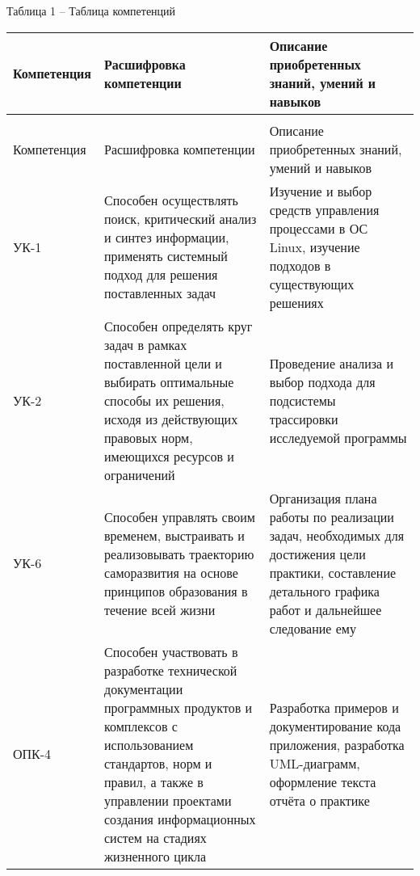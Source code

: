 \vspace{12pt}
\noindent Таблица 1 -- Таблица компетенций
\vspace{-5pt}
{
	\fontsize{13}{9}\selectfont
	\noindent \begin{longtable}[c]{|p{2.6cm}|p{6.2cm}|p{6cm}|}
		\hline
		Компетенция & Расшифровка компетенции & Описание приобретенных знаний, умений и навыков \\
		
		\endfirsthead
		\caption*{\raggedright Продолжение таблицы 1\vspace*{-35pt}}\\
		\hline
		Компетенция & Расшифровка компетенции & Описание приобретенных знаний, умений и навыков \\
		\endhead
		
		\hline
		УК-1 &
		Способен осуществлять поиск, критический анализ и синтез информации, применять системный подход для решения поставленных задач &
		Изучение и выбор средств управления процессами в ОС Linux, изучение подходов в существующих решениях
		\\ \hline
		
		УК-2 &
		Способен определять круг задач в рамках поставленной цели и выбирать оптимальные способы их решения, исходя из действующих правовых норм, имеющихся ресурсов и ограничений &
		Проведение анализа и выбор подхода для подсистемы трассировки исследуемой программы
		\\ \hline
		
		УК-6 & 
		Способен управлять своим временем, выстраивать и реализовывать траекторию саморазвития на основе принципов образования в течение всей жизни & 
		Организация плана работы по реализации задач, необходимых для достижения цели практики, составление детального графика работ и дальнейшее следование ему
		\\ \hline
		
		ОПК-4 & 
		Способен участвовать в разработке технической документации программных продуктов и комплексов с использованием стандартов, норм и правил, а также в управлении проектами создания информационных систем на стадиях жизненного цикла & 
		Разработка примеров и документирование кода приложения, разработка UML-диаграмм, оформление текста отчёта о практике
		\\ \hline
		
	\end{longtable}
}
